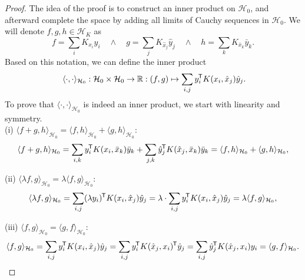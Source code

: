 \documentclass[11pt, a4paper]{article}
\newcommand{\R}{\mathbb{R}}
\renewcommand{\H}{\mathcal{H}}
\newcommand*{\tr}{^{\mkern-1.5mu\mathsf{T}}}
\begin{document}
\begin{proof}
The idea of the proof is to construct an inner product on $\H_0$, and afterward complete the space by adding all limits of Cauchy sequences in $\H_0$. We will denote  $f,g,h \in \H_K$ as
\[ f = \sum_{i} K_{x_i}y_i \quad \wedge \quad g = \sum_{j} K_{\hat{x}_j}\hat{y}_j \quad \wedge \quad h = \sum_{k} K_{\bar{x}_k}\bar{y}_k. \]
Based on this notation, we can define the inner product 
\[ \langle \cdot, \cdot \rangle_{\H_0} : \H_0 \times \H_0 \to \R : (f,g) \mapsto \sum_{i,j} y_i \tr K(x_i, \hat{x}_j) \hat{y}_j. \]
To prove that $\langle \cdot, \cdot \rangle_{\H_0}$ is indeed an inner product, we start with linearity and symmetry. \\

(i) $\langle f + g , h \rangle_{\H_0} = \langle f , h \rangle_{\H_0} + \langle g , h \rangle_{\H_0}$:
\[ \langle f + g , h \rangle_{\H_0} = \sum_{i,k} y_i \tr K(x_i, \bar{x}_k) \bar{y}_k +  \sum_{j,k} \hat{y}_j \tr K(\hat{x}_j, \bar{x}_k) \bar{y}_k = \langle f , h \rangle_{\H_0} + \langle g , h \rangle_{\H_0}, \]

(ii) $\langle \lambda f , g \rangle_{\H_0} = \lambda \langle f, g \rangle_{\H_0}$:
\[ \langle \lambda f , g \rangle_{\H_0} = \sum_{i,j} (\lambda y_i) \tr K(x_i, \hat{x}_j) \hat{y}_j = \lambda \cdot \sum_{i,j} y_i \tr K(x_i, \hat{x}_j) \hat{y}_j = \lambda \langle f, g \rangle_{\H_0},  \]

(iii) $\langle f , g \rangle_{\H_0} = \langle g , f \rangle_{\H_0}$:
\[ \langle f , g \rangle_{\H_0} = \sum_{i,j} y_i \tr K(x_i, \hat{x}_j) \hat{y}_j = \sum_{i,j} y_i \tr K(\hat{x}_j,x_i) \tr \hat{y}_j = \sum_{i,j} \hat{y}_j \tr K(\hat{x}_j, x_i) y_i = \langle g , f \rangle_{\H_0}. \]


\end{proof}
\end{document}

